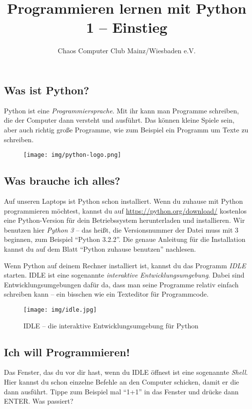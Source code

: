 



	\title{Programmieren lernen mit Python\\1 – Einstieg}
	\author{Chaos Computer Club Mainz/Wiesbaden e.V.}
	\maketitle
	
	\subsection*{Was ist Python?}
	Python ist eine \emph{Programmiersprache}. Mit ihr kann man Programme schreiben, die der Computer dann versteht und ausführt. Das können kleine Spiele sein, aber auch richtig große Programme, wie zum Beispiel ein Programm um Texte zu schreiben.
	
	\begin{figure}[htbp]
		\centering
		\texttt{[image: img/python-logo.png]}
	\end{figure}
	
	\subsection*{Was brauche ich alles?}
	Auf unseren Laptops ist Python schon installiert. Wenn du zuhause mit Python programmieren möchtest, kannst du auf \url{https://python.org/download/} kostenlos eine Python-Version für dein Betriebssystem herunterladen und installieren. Wir benutzen hier \emph{Python 3} – das heißt, die Versionsnummer der Datei muss mit 3 beginnen, zum Beispiel \enquote{Python 3.2.2}. Die  genaue Anleitung für die Installation kannst du auf dem Blatt \enquote{Python zuhause benutzen} nachlesen.
	
	Wenn Python auf deinem Rechner installiert ist, kannst du das Programm \emph{IDLE} starten. IDLE ist eine sogenannte \emph{interaktive Entwicklungsumgebung}. Dabei sind Entwicklungsumgebungen dafür da, dass man seine Programme relativ einfach schreiben kann – ein bisschen wie ein Texteditor für Programmcode.
	
	\begin{figure}[htbp]
		\centering
		\texttt{[image: img/idle.jpg]}
		\caption{IDLE – die interaktive Entwicklungsumgebung für Python}
		\label{IDLE}
	\end{figure}
	
	\subsection*{Ich will Programmieren!}
	Das Fenster, das du vor dir hast, wenn du IDLE öffnest ist eine sogenannte \emph{Shell}. Hier kannst du schon einzelne Befehle an den Computer schicken, damit er die dann ausführt. Tippe zum Beispiel mal \enquote{1+1} in das Fenster und drücke dann ENTER. Was passiert?
	
